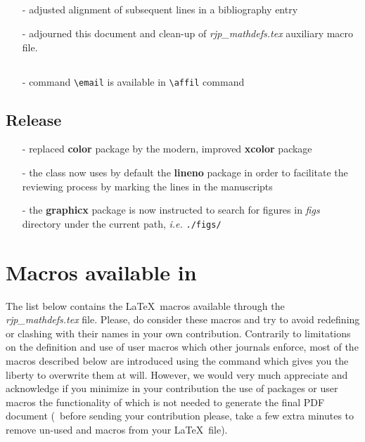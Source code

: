 \documentclass[myclassdoc,debug]{rjparticle}
\begin{document}
\subsection{}
\begin{itemize}
 \item[-] adjusted alignment of subsequent lines in a bibliography entry
 \item[-] adjourned this document and clean-up of \textit{rjp\_mathdefs.tex} auxiliary macro file.
\end{itemize}

\subsection{}
\begin{itemize}
 \item[-] command \texttt{\textbackslash email} is available in \texttt{\textbackslash affil} command
\end{itemize}

\subsection{Release }
\begin{itemize}
\item[-] replaced \textbf{color} package by the modern, improved \textbf{xcolor} package
\item[-] the class now uses by default the \textbf{lineno} package in order to facilitate the reviewing process by marking the lines in the manuscripts
\item[-] the \textbf{graphicx} package is now instructed to search for figures in \textit{figs} directory under the current path, \textit{i.e.} \texttt{\small ./figs/}
\end{itemize}

\section{Macros available in }

The list below contains the \LaTeX\ macros available through the \textit{rjp\_mathdefs.tex} file. Please, do consider these macros and try to avoid redefining or clashing with their names in your own contribution. Contrarily to limitations on the definition and use of user macros which other journals enforce, most of the macros described below are introduced using the  command which gives you the liberty to overwrite them at will. However, we would very much appreciate and acknowledge if you minimize in your contribution the use of packages or user macros the functionality of which is not needed to generate the final PDF document (\ie\ before sending your contribution please, take a few extra minutes to remove un-used  and macros from your \LaTeX\ file).
\end{document}
